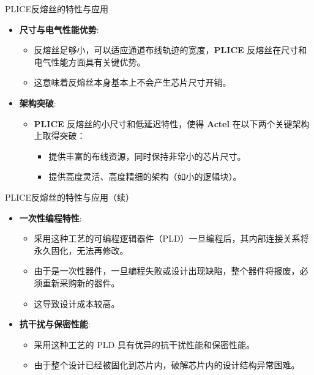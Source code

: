 \documentclass[
  ignorenonframetext,
  chinese,
]{beamer}
\providecommand{\tightlist}{%
  \setlength{\itemsep}{0pt}\setlength{\parskip}{0pt}}
\begin{document}
\begin{frame}
\begin{block}{PLICE反熔丝的特性与应用}
\label{pliceux53cdux7194ux4e1dux7684ux7279ux6027ux4e0eux5e94ux7528}
\begin{itemize}
\tightlist
\item
  \textbf{尺寸与电气性能优势}:

  \begin{itemize}
  \tightlist
  \item
    反熔丝足够小，可以适应通道布线轨迹的宽度，\textbf{PLICE}
    反熔丝在尺寸和电气性能方面具有关键优势。
  \item
    这意味着反熔丝本身基本上不会产生芯片尺寸开销。
  \end{itemize}
\item
  \textbf{架构突破}:

  \begin{itemize}
  \tightlist
  \item
    \textbf{PLICE} 反熔丝的小尺寸和低延迟特性，使得 \textbf{Actel}
    在以下两个关键架构上取得突破：

    \begin{itemize}
    \tightlist
    \item
      提供丰富的布线资源，同时保持非常小的芯片尺寸。
    \item
      提供高度灵活、高度精细的架构（如小的逻辑块）。
    \end{itemize}
  \end{itemize}
\end{itemize}
\end{block}
\end{frame}

\begin{frame}
\begin{block}{PLICE反熔丝的特性与应用（续）}
\begin{itemize}
\tightlist
\item
  \textbf{一次性编程特性}:

  \begin{itemize}
  \tightlist
  \item
    采用这种工艺的可编程逻辑器件（PLD）一旦编程后，其内部连接关系将永久固化，无法再修改。
  \item
    由于是一次性器件，一旦编程失败或设计出现缺陷，整个器件将报废，必须重新采购新的器件。
  \item
    这导致设计成本较高。
  \end{itemize}
\item
  \textbf{抗干扰与保密性能}:

  \begin{itemize}
  \tightlist
  \item
    采用这种工艺的 PLD 具有优异的抗干扰性能和保密性能。
  \item
    由于整个设计已经被固化到芯片内，破解芯片内的设计结构异常困难。
  \end{itemize}
\end{itemize}
\end{block}
\end{frame}
\end{document}
